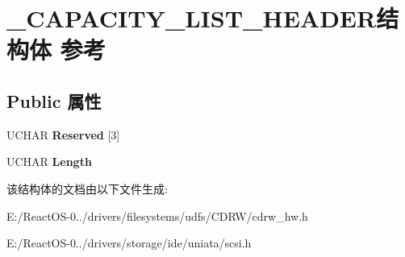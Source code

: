 \hypertarget{struct___c_a_p_a_c_i_t_y___l_i_s_t___h_e_a_d_e_r}{}\section{\+\_\+\+C\+A\+P\+A\+C\+I\+T\+Y\+\_\+\+L\+I\+S\+T\+\_\+\+H\+E\+A\+D\+E\+R结构体 参考}
\label{struct___c_a_p_a_c_i_t_y___l_i_s_t___h_e_a_d_e_r}
\subsection*{Public 属性}
\begin{DoxyCompactItemize}
\item 
\mbox{\label{struct___c_a_p_a_c_i_t_y___l_i_s_t___h_e_a_d_e_r_aa40fb3571525d17023b53ae42ea4769f}} 
U\+C\+H\+AR {\bfseries Reserved} \mbox{[}3\mbox{]}
\item 
\mbox{\label{struct___c_a_p_a_c_i_t_y___l_i_s_t___h_e_a_d_e_r_ae07c3eee711f90a57ccdc39f4f62fc26}} 
U\+C\+H\+AR {\bfseries Length}
\end{DoxyCompactItemize}


该结构体的文档由以下文件生成\+:\begin{DoxyCompactItemize}
\item 
E\+:/\+React\+O\+S-\/0../drivers/filesystems/udfs/\+C\+D\+R\+W/cdrw\+\_\+hw.\+h\item 
E\+:/\+React\+O\+S-\/0../drivers/storage/ide/uniata/scsi.\+h\end{DoxyCompactItemize}
